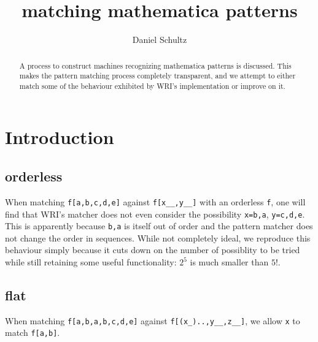 \documentclass[12 pt]{amsart}
\begin{document}
\title{matching mathematica patterns}
\author{Daniel Schultz}
\begin{abstract}
A process to construct machines recognizing mathematica patterns is discussed. This makes the pattern matching process completely transparent, and we attempt to either match some of the behaviour exhibited by WRI's implementation or improve on it.
\end{abstract}
\maketitle

\section{Introduction}
\subsection{orderless} When matching {\tt f[a,b,c,d,e]} against {\tt f[x\_\_,y\_\_]} with an orderless {\tt f}, one will find that WRI's matcher does not even consider the possibility {\tt x=b,a}, {\tt y=c,d,e}. This is apparently because {\tt b,a} is itself out of order and the pattern matcher does not change the order in sequences. While not completely ideal, we reproduce this behaviour simply because it cuts down on the number of possiblity to be tried while still retaining some useful functionality: $2^5$ is much smaller than $5!$.
\subsection{flat} When matching {\tt f[a,b,a,b,c,d,e]} against {\tt f[(x\_)..,y\_\_,z\_\_]}, we allow {\tt x} to match {\tt f[a,b]}.
\end{document}
